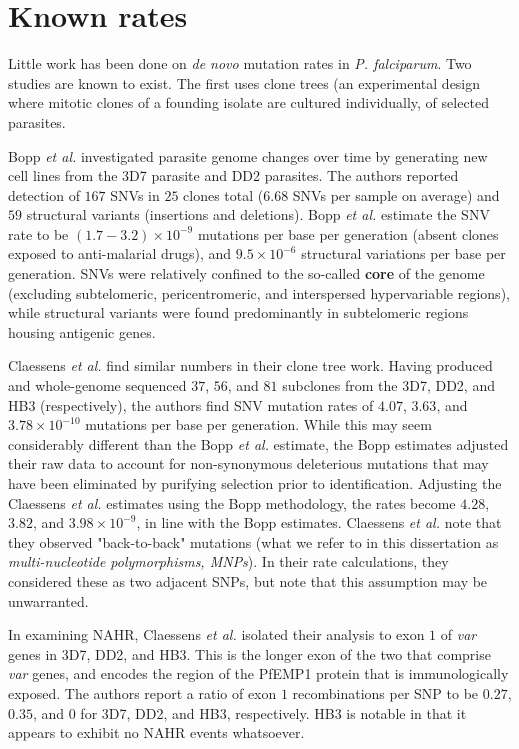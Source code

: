 \section{Known rates}

Little work has been done on \textit{de novo} mutation rates in \textit{P. falciparum}.  Two studies are known to exist.  The first uses clone trees (an experimental design where mitotic clones of a founding isolate are cultured individually, of selected parasites.

Bopp \textit{et al.} investigated parasite genome changes over time by generating new cell lines from the 3D7 parasite and DD2 parasites.  The authors reported detection of $167$ SNVs in $25$ clones total ($6.68$ SNVs per sample on average) and $59$ structural variants (insertions and deletions).  Bopp \textit{et al.} estimate the SNV rate to be $(1.7-3.2) \times 10^{-9}$ mutations per base per generation (absent clones exposed to anti-malarial drugs), and $9.5 \times 10^{-6}$ structural variations per base per generation\cite{Bopp:2013gr}.  SNVs were relatively confined to the so-called \textbf{core} of the genome (excluding subtelomeric, pericentromeric, and interspersed hypervariable regions), while structural variants were found predominantly in subtelomeric regions housing antigenic genes.

Claessens \textit{et al.} find similar numbers in their clone tree work.  Having produced and whole-genome sequenced $37$, $56$, and $81$ subclones from the 3D7, DD2, and HB3 (respectively), the authors find SNV mutation rates of $4.07$, $3.63$, and $3.78 \times 10^{-10}$ mutations per base per generation\cite{Claessens:2014fo}.  While this may seem considerably different than the Bopp \textit{et al.} estimate, the Bopp estimates adjusted their raw data to account for non-synonymous deleterious mutations that may have been eliminated by purifying selection prior to identification.  Adjusting the Claessens \textit{et al.} estimates using the Bopp methodology, the rates become $4.28$, $3.82$, and $3.98 \times 10^{-9}$, in line with the Bopp estimates.  Claessens \textit{et al.} note that they observed "back-to-back" mutations (what we refer to in this dissertation as \textit{multi-nucleotide polymorphisms, MNPs}).  In their rate calculations, they considered these as two adjacent SNPs, but note that this assumption may be unwarranted.

In examining NAHR, Claessens \textit{et al.} isolated their analysis to exon $1$ of \textit{var} genes in 3D7, DD2, and HB3.  This is the longer exon of the two that comprise \textit{var} genes, and encodes the region of the PfEMP1 protein that is immunologically exposed.  The authors report a ratio of exon $1$ recombinations per SNP to be $0.27$, $0.35$, and $0$ for 3D7, DD2, and HB3, respectively.  HB3 is notable in that it appears to exhibit no NAHR events whatsoever.

